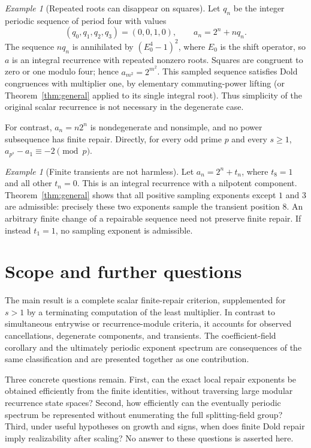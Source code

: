 \documentclass[11pt]{article}
\theoremstyle{definition}
\theoremstyle{remark}
\newtheorem{example}[theorem]{Example}
\begin{document}
\begin{example}[Repeated roots can disappear on squares]\label{ex:degenerate}
Let $q_n$ be the integer periodic sequence of period four with values
\[
 (q_0,q_1,q_2,q_3)=(0,0,1,0),
 \qquad a_n=2^n+nq_n.
\]
The sequence $nq_n$ is annihilated by $(E_0^4-1)^2$, where $E_0$ is the shift operator, so $a$ is an integral recurrence with repeated nonzero roots. Squares are congruent to zero or one modulo four; hence $a_{m^2}=2^{m^2}$. This sampled sequence satisfies Dold congruences with multiplier one, by elementary commuting-power lifting (or Theorem~\ref{thm:general} applied to its single integral root). Thus simplicity of the original scalar recurrence is not necessary in the degenerate case.

For contrast, $a_n=n2^n$ is nondegenerate and nonsimple, and no power subsequence has finite repair. Directly, for every odd prime $p$ and every $s\geq1$, $a_{p^s}-a_1\equiv-2\pmod p$.
\end{example}

\begin{example}[Finite transients are not harmless]
Let $a_n=2^n+t_n$, where $t_8=1$ and all other $t_n=0$. This is an integral recurrence with a nilpotent component. Theorem~\ref{thm:general} shows that all positive sampling exponents except $1$ and $3$ are admissible: precisely these two exponents sample the transient position $8$. An arbitrary finite change of a repairable sequence need not preserve finite repair. If instead $t_1=1$, no sampling exponent is admissible.
\end{example}

\section{Scope and further questions}
The main result is a complete scalar finite-repair criterion, supplemented for $s>1$ by a terminating computation of the least multiplier. In contrast to simultaneous entrywise or recurrence-module criteria, it accounts for observed cancellations, degenerate components, and transients. The coefficient-field corollary and the ultimately periodic exponent spectrum are consequences of the same classification and are presented together as one contribution.

Three concrete questions remain. First, can the exact local repair exponents be obtained efficiently from the finite identities, without traversing large modular recurrence state spaces? Second, how efficiently can the eventually periodic spectrum be represented without enumerating the full splitting-field group? Third, under useful hypotheses on growth and signs, when does finite Dold repair imply realizability after scaling? No answer to these questions is asserted here.
\end{document}
